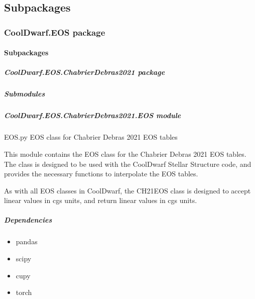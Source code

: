 \documentclass[letterpaper,10pt,english]{sphinxmanual}
\begin{document}
\subsection{Subpackages}
\label{\detokenize{CoolDwarf:subpackages}}
\sphinxstepscope


\subsubsection{CoolDwarf.EOS package}
\label{\detokenize{CoolDwarf.EOS:cooldwarf-eos-package}}\label{\detokenize{CoolDwarf.EOS::doc}}

\paragraph{Subpackages}
\label{\detokenize{CoolDwarf.EOS:subpackages}}
\sphinxstepscope


\subparagraph{CoolDwarf.EOS.ChabrierDebras2021 package}
\label{\detokenize{CoolDwarf.EOS.ChabrierDebras2021:cooldwarf-eos-chabrierdebras2021-package}}\label{\detokenize{CoolDwarf.EOS.ChabrierDebras2021::doc}}

\subparagraph{Submodules}
\label{\detokenize{CoolDwarf.EOS.ChabrierDebras2021:submodules}}

\subparagraph{CoolDwarf.EOS.ChabrierDebras2021.EOS module}
\label{\detokenize{CoolDwarf.EOS.ChabrierDebras2021:module-CoolDwarf.EOS.ChabrierDebras2021.EOS}}\label{\detokenize{CoolDwarf.EOS.ChabrierDebras2021:cooldwarf-eos-chabrierdebras2021-eos-module}}
\sphinxAtStartPar
EOS.py \textendash{} EOS class for Chabrier Debras 2021 EOS tables

\sphinxAtStartPar
This module contains the EOS class for the Chabrier Debras 2021 EOS tables. The class is designed to be used with the
CoolDwarf Stellar Structure code, and provides the necessary functions to interpolate the EOS tables.

\sphinxAtStartPar
As with all EOS classes in CoolDwarf, the CH21EOS class is designed to accept linear values in cgs units, and return
linear values in cgs units.


\subparagraph{Dependencies}
\label{\detokenize{CoolDwarf.EOS.ChabrierDebras2021:dependencies}}\begin{itemize}
\item {} 
\sphinxAtStartPar
pandas

\item {} 
\sphinxAtStartPar
scipy

\item {} 
\sphinxAtStartPar
cupy

\item {} 
\sphinxAtStartPar
torch

\end{itemize}
\end{document}
